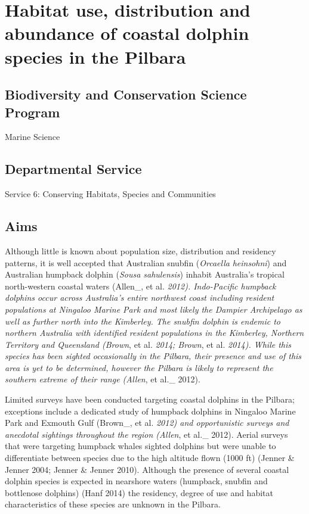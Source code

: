 \documentclass[version=last,
    paper=a4,                               %
    10pt,                                   %
    dvipsnames,
    oneside,                              %
    headings=openany,                       %
    open=any,
    BCOR=7mm,                               %
    DIV=15,     %
]{scrbook}
\begin{document}
\section*{Habitat use, distribution and abundance of coastal dolphin species in
the Pilbara
}



\subsection*{Biodiversity and Conservation Science Program}

Marine Science




\subsection*{Departmental Service}

Service 6: Conserving Habitats, Species and Communities




\subsection*{Aims}

Although little is known about population size, distribution and
residency patterns, it is well accepted that Australian snubfin
(\emph{Orcaella} \emph{heinsohni}) and Australian humpback dolphin
(\emph{Sousa sahulensis}) inhabit Australia's tropical north-western
coastal waters (Allen\_, et al. \emph{2012). Indo-Pacific humpback
dolphins occur across Australia's entire northwest coast including
resident populations at Ningaloo Marine Park and most likely the Dampier
Archipelago as well as further north into the Kimberley. The snubfin
dolphin is endemic to northern Australia with identified resident
populations in the Kimberley, Northern Territory and Queensland (Brown},
et al. \emph{2014; Brown}, et al. \emph{2014). While this species has
been sighted occasionally in the Pilbara, their presence and use of this
area is yet to be determined, however the Pilbara is likely to represent
the southern extreme of their range (Allen}, et al.\_ 2012).

Limited surveys have been conducted targeting coastal dolphins in the
Pilbara; exceptions include a dedicated study of humpback dolphins in
Ningaloo Marine Park and Exmouth Gulf (Brown\_, et al. \emph{2012) and
opportunistic surveys and anecdotal sightings throughout the region
(Allen}, et al.\_ 2012). Aerial surveys that were targeting humpback
whales sighted dolphins but were unable to differentiate between species
due to the high altitude flown (1000 ft) (Jenner \& Jenner 2004; Jenner
\& Jenner 2010). Although the presence of several coastal dolphin
species is expected in nearshore waters (humpback, snubfin and
bottlenose dolphins) (Hanf 2014) the residency, degree of use and
habitat characteristics of these species are unknown in the Pilbara.
\end{document}
